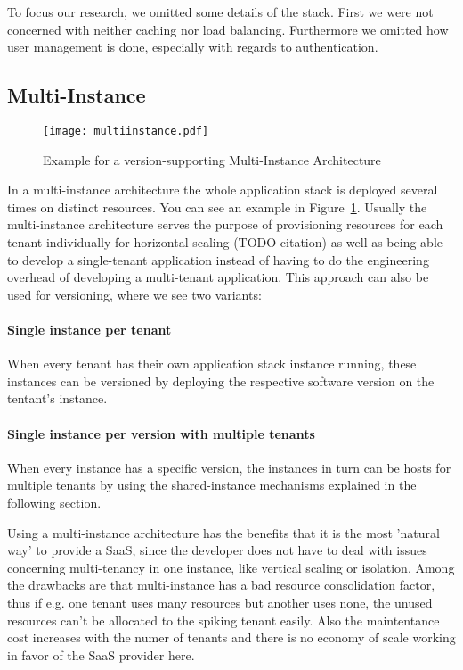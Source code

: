To focus our research, we omitted some details of the stack. First we were not concerned with neither caching nor load balancing. Furthermore we omitted how user management is done, especially with regards to authentication.

\subsection{Multi-Instance}

\begin{figure}
\centering
\texttt{[image: multiinstance.pdf]}
\caption{Example for a version-supporting Multi-Instance Architecture}
\label{fig:multiinstance}
\end{figure}

In a multi-instance architecture the whole application stack is deployed several times on distinct resources. You can see an example in Figure~\ref{fig:multiinstance}. Usually the multi-instance architecture serves the purpose of provisioning resources for each tenant individually for horizontal scaling (TODO citation) as well as being able to develop a single-tenant application instead of having to do the engineering overhead of developing a multi-tenant application. This approach can also be used for versioning, where we see two variants:

\paragraph{Single instance per tenant} When every tenant has their own application stack instance running, these instances can be versioned by deploying the respective software version on the tentant's instance.
\paragraph{Single instance per version with multiple tenants} When every instance has a specific version, the instances in turn can be hosts for multiple tenants by using the shared-instance mechanisms explained in the following section.

Using a multi-instance architecture has the benefits that it is the most 'natural way' to provide a SaaS, since the developer does not have to deal with issues concerning multi-tenancy in one instance, like vertical scaling or isolation. Among the drawbacks are that multi-instance has a bad resource consolidation factor, thus if e.g. one tenant uses many resources but another uses none, the unused resources can't be allocated to the spiking tenant easily. Also the maintentance cost increases with the numer of tenants and there is no economy of scale working in favor of the SaaS provider here.

